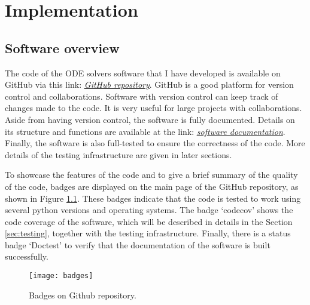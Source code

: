 \chapter{Implementation}
\label{chap:code-implementation}
\section{Software overview}
\label{sec:software-overview}
The code of the ODE solvers software that I have developed is available on GitHub via this link: \href{https://github.com/FarmHJ/numerical-solver}{\underline{\emph{GitHub repository}}}. GitHub is a good
platform for version control and collaborations. Software with version control can keep track of changes made to the code. It is very useful for large projects with collaborations. Aside from having version control, the software is fully documented. Details on its structure and functions are available at the link: \href{https://numerical-solver.readthedocs.io/en/latest/index.html}{\underline{\emph{software documentation}}}. Finally, the software is also full-tested to ensure the correctness of the code. More details of the testing infrastructure are given in later sections. 

To showcase the features of the code and to give a brief summary of the quality of the code, badges are displayed on the main page of the GitHub repository, as shown in Figure \ref{fig:badges}. These badges indicate that the code is tested to work using several python versions and operating systems. The badge `codecov' shows the code coverage of the software, which will be described in details in the Section \ref{sec:testing}, together with the testing infrastructure. Finally, there is a status badge `Doctest' to verify that the documentation of the software is built successfully.

\begin{figure}
    \texttt{[image: badges]}
    \caption{Badges on Github repository.}
    \label{fig:badges}
\end{figure}

